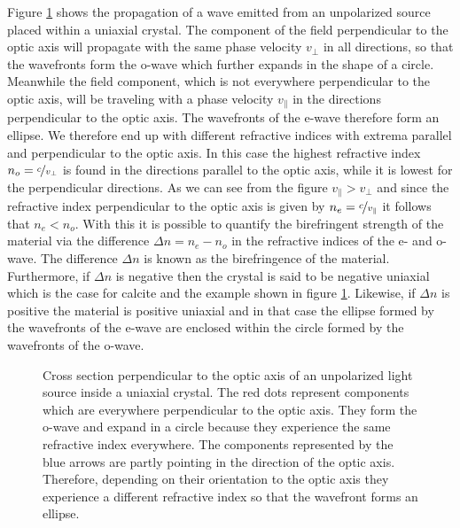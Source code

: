 Figure \ref{fig:uniaxial_source} shows the propagation of a wave emitted from an unpolarized source placed within a uniaxial crystal. The component of the field perpendicular to the optic axis will propagate with the same phase velocity $v_{\bot}$ in all directions, so that the wavefronts form the o-wave which further expands in the shape of a circle. Meanwhile the field component, which is not everywhere perpendicular to the optic axis, will be traveling with a phase velocity $v_{\parallel}$ in the directions perpendicular to the optic axis. The wavefronts of the e-wave therefore form an ellipse. We therefore end up with different refractive indices with extrema parallel and perpendicular to the optic axis. In this case the highest refractive index $n_o = \nicefrac{c}{v_{\bot}}$ is found in the directions parallel to the optic axis, while it is lowest for the perpendicular directions. As we can see from the figure $v_{\parallel} > v_{\bot}$ and since the refractive index perpendicular to the optic axis is given by $n_e = \nicefrac{c}{v_{\parallel}}$ it follows that $n_e < n_o$. With this it is possible to quantify the birefringent strength of the material via the difference $\Delta n = n_e - n_o$ in the refractive indices of the e- and o-wave. The difference $\Delta n$ is known as the birefringence of the material. Furthermore, if $\Delta n$ is negative then the crystal is said to be negative uniaxial which is the case for calcite and the example shown in figure \ref{fig:uniaxial_source}. Likewise, if $\Delta n$ is positive the material is positive uniaxial and in that case the ellipse formed by the wavefronts of the e-wave are enclosed within the circle formed by the wavefronts of the o-wave. 

\begin{figure}[h]
    \centering
    
    \caption{Cross section perpendicular to the optic axis of an unpolarized light source inside a uniaxial crystal. The red dots represent components which are everywhere perpendicular to the optic axis. They form the o-wave and expand in a circle because they experience the same refractive index everywhere. The components represented by the blue arrows are partly pointing in the direction of the optic axis. Therefore, depending on their orientation to the optic axis they experience a different refractive index so that the wavefront forms an ellipse.}
    \label{fig:uniaxial_source}
\end{figure}

